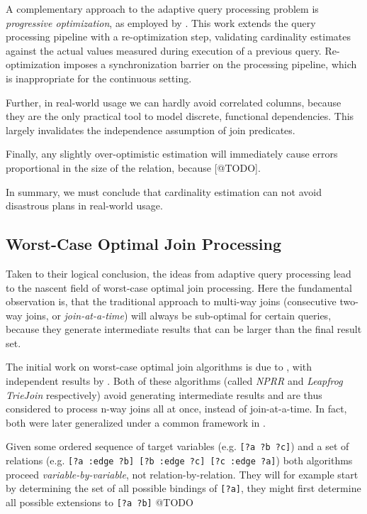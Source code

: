 \documentclass[../index.tex]{subfiles}
\begin{document}
A complementary approach to the adaptive query processing problem is
\emph{progressive optimization}, as employed by
\cite{markl2004robust}. This work extends the query processing
pipeline with a re-optimization step, validating cardinality estimates
against the actual values measured during execution of a previous
query. Re-optimization imposes a synchronization barrier on the
processing pipeline, which is inappropriate for the continuous
setting.

Further, in real-world usage we can hardly avoid correlated columns,
because they are the only practical tool to model discrete, functional
dependencies. This largely invalidates the independence assumption of
join predicates.

Finally, any slightly over-optimistic estimation will immediately
cause errors proportional in the size of the relation, because
[@TODO].

In summary, we must conclude that cardinality estimation can not avoid
disastrous plans in real-world usage.

\subsection{Worst-Case Optimal Join Processing} \label{technique-wco}

Taken to their logical conclusion, the ideas from adaptive query
processing lead to the nascent field of worst-case optimal join
processing. Here the fundamental observation is, that the traditional
approach to multi-way joins (consecutive two-way joins, or
\emph{join-at-a-time}) will always be sub-optimal for certain queries,
because they generate intermediate results that can be larger than the
final result set.

The initial work on worst-case optimal join algorithms is due to
\cite{ngo2012worst}, with independent results by
\cite{veldhuizen2012leapfrog}. Both of these algorithms (called
\emph{NPRR} and \emph{Leapfrog TrieJoin} respectively) avoid
generating intermediate results and are thus considered to process
n-way joins all at once, instead of join-at-a-time. In fact, both were
later generalized under a common framework in \cite{ngo2013skew}.

Given some ordered sequence of target variables (e.g. \texttt{[?a ?b
    ?c]}) and a set of relations (e.g. \texttt{{[?a :edge ?b] [?b
      :edge ?c] [?c :edge ?a]}}) both algorithms proceed
\emph{variable-by-variable}, not relation-by-relation. They will for
example start by determining the set of all possible bindings of
\texttt{[?a]}, they might first determine all possible extensions to
\texttt{[?a ?b]} @TODO
\end{document}
